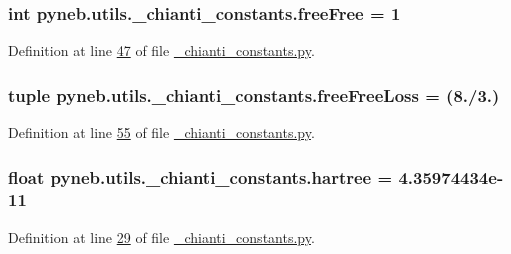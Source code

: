 \subsubsection[{free\+Free}]{\setlength{\rightskip}{0pt plus 5cm}int pyneb.\+utils.\+\_\+chianti\+\_\+constants.\+free\+Free = 1}\label{namespacepyneb_1_1utils_1_1__chianti__constants_acb6e045304d6339f57d58214db1f2395}


Definition at line \hyperlink{__chianti__constants_8py_source_l00047}{47} of file \hyperlink{__chianti__constants_8py_source}{\+\_\+chianti\+\_\+constants.\+py}.

\hypertarget{namespacepyneb_1_1utils_1_1__chianti__constants_a46456dd338306ad50b0995e659d51645}{}
\subsubsection[{free\+Free\+Loss}]{\setlength{\rightskip}{0pt plus 5cm}tuple pyneb.\+utils.\+\_\+chianti\+\_\+constants.\+free\+Free\+Loss = (8./3.)}\label{namespacepyneb_1_1utils_1_1__chianti__constants_a46456dd338306ad50b0995e659d51645}


Definition at line \hyperlink{__chianti__constants_8py_source_l00055}{55} of file \hyperlink{__chianti__constants_8py_source}{\+\_\+chianti\+\_\+constants.\+py}.

\hypertarget{namespacepyneb_1_1utils_1_1__chianti__constants_a69a9c70ea753a4a67244d99f3c0d0033}{}
\subsubsection[{hartree}]{\setlength{\rightskip}{0pt plus 5cm}float pyneb.\+utils.\+\_\+chianti\+\_\+constants.\+hartree = 4.\+35974434e-\/11}\label{namespacepyneb_1_1utils_1_1__chianti__constants_a69a9c70ea753a4a67244d99f3c0d0033}


Definition at line \hyperlink{__chianti__constants_8py_source_l00029}{29} of file \hyperlink{__chianti__constants_8py_source}{\+\_\+chianti\+\_\+constants.\+py}.

